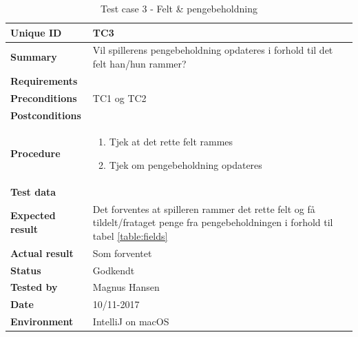 \begin{table}[H]
    \begin{center}
        \begin{tabular}{|l|p{8cm}|}
            \hline
            \textbf{Unique ID} & TC3 \\
            \hline
            \textbf{Summary} & Vil spillerens pengebeholdning opdateres i forhold til det felt han/hun rammer? \\
            \hline
            \textbf{Requirements} & \\
            \hline
            \textbf{Preconditions} & TC1 og TC2 \\
            \hline
            \textbf{Postconditions} & \\
            \hline
            \textbf{Procedure} & \begin{enumerate}
                \setlength\itemsep{0ex}
                \item Tjek at det rette felt rammes
                \item Tjek om pengebeholdning opdateres
            \end{enumerate} \\
            \hline
            \textbf{Test data} & \\
            \hline
            \textbf{Expected result} & Det forventes at spilleren rammer det rette felt og få tildelt/frataget penge fra pengebeholdningen i forhold til tabel \ref{table:fields} \\
            \hline
            \textbf{Actual result} & Som forventet \\
            \hline
            \textbf{Status} & Godkendt \\
            \hline
            \textbf{Tested by} & Magnus Hansen \\
            \hline
            \textbf{Date} & 10/11-2017 \\
            \hline
            \textbf{Environment} & IntelliJ on macOS \\
            \hline
        \end{tabular}
    \end{center}
    \caption{Test case 3 - Felt \& pengebeholdning}
    \label{tc:3}
\end{table}

